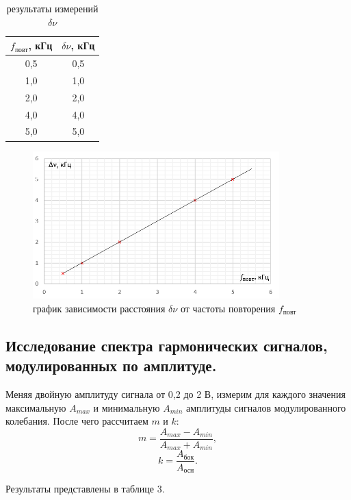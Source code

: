 \documentclass[a4paper]{article}
\theoremstyle{definition}
\theoremstyle{remark}
\begin{document}
 \begin{table}[h!]
    \centering
    \caption{результаты измерений $\delta\nu$}
    \begin{tabular}{|c|c|}
    \hline
    $f_{\text{повт}}$, кГц & $\delta\nu$, кГц \\ \hline
    0,5 & 0,5                \\ \hline
    1,0 & 1,0                \\ \hline
    2,0 & 2,0                \\ \hline
    4,0 & 4,0                \\ \hline
    5,0 & 5,0                \\ \hline
    \end{tabular}
    \end{table}


    \begin{figure}[h!]
        \centering
        \includegraphics[width = 270pt]{image/graph2.png}
        \caption{график зависимости расстояния $\delta\nu$ от частоты повторения $f_{\text{повт}}$}
    \end{figure}


\subsection{Исследование спектра гармонических сигналов, модулированных по амплитуде.}

Меняя двойную амплитуду сигнала от 0,2 до 2 В, измерим для каждого значения максимальную $A_{max}$ и минимальную $A_{min}$ амплитуды сигналов модулированного колебания. После чего рассчитаем $m$ и $k$: $$m = \frac{A_{max} - A_{min}}{A_{max}+A_{min}},$$ $$k = \frac{A_{\text{бок}}}{A_{\text{осн}}}.$$ 

\noindent Результаты представлены в таблице 3.
\end{document}

